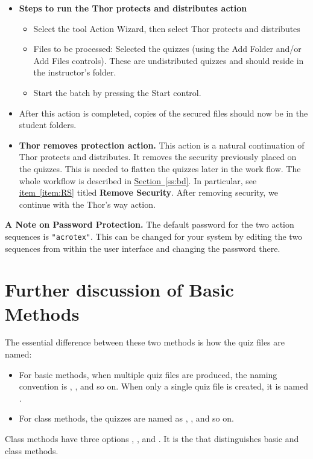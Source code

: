 \documentclass{article}
\begin{document}
\begin{itemize}
\goodbreak
      \item[]\textbf{Steps to run the \textsf{Thor protects and distributes} action}
      \begin{itemize}
        \item Select the tool \textsf{Action Wizard}, then select
            \textsf{Thor protects and distributes}
        \item\textsf{Files to be processed:} Selected the quizzes
            (using the \textsf{Add Folder} and/or \textsf{Add Files}
            controls). These are undistributed quizzes and should
            reside in the instructor's folder.
        \item Start the batch by pressing the \textsf{Start} control.
      \end{itemize}
      \item[] After this action is completed, copies of the secured files should
        now be in the student folders.
  \item \textbf{\textsf{Thor removes protection} action.} This action is a
      natural continuation of \textsf{Thor protects and distributes}. It
      removes the security previously placed on the quizzes. This is needed
      to flatten the quizzes later in the work flow. The whole workflow is
      described in \hyperref[ss:bd]{Section~\ref{ss:bd}}. In particular,
      see \hyperref[item:RS]{item~\ref*{item:RS}} titled \textbf{Remove Security}.
      After removing security, we continue with the \textsf{Thor's way} action.
\end{itemize}
\textbf{A Note on Password Protection.} The default password for the two
action sequences is \texttt{"acrotex"}. This can be changed for your system
by editing the two sequences from within the  user interface and
changing the password there.

\section{Further discussion of Basic Methods}

The essential difference between these two methods is how the quiz files are
named:
\begin{itemize}
  \item For basic methods, when multiple quiz files are produced, the
      naming convention is , , and so
      on. When only a single quiz file is created, it is named
      .
  \item For class methods, the quizzes are named as
      ,
      , and so on.
\end{itemize}
Class methods have three options , , and .
It is the  that distinguishes basic and class methods.
\end{document}
